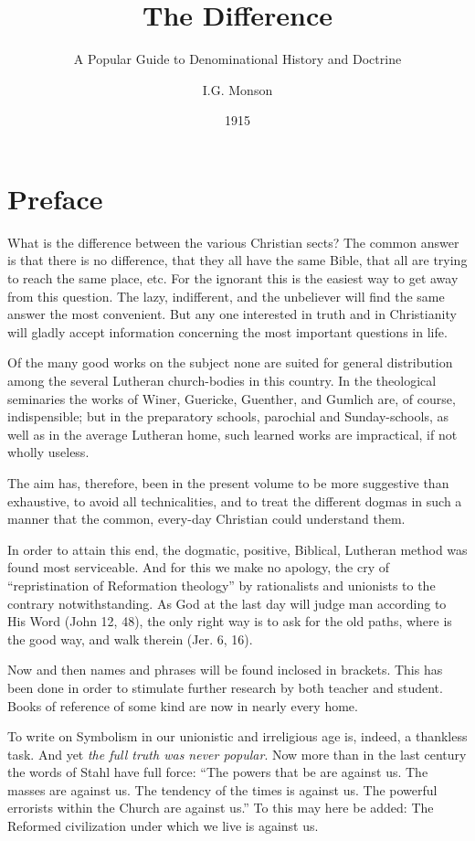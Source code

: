 \documentclass[
]{book}
\title{The Difference}
\subtitle{A Popular Guide to Denominational History and Doctrine}
\author{I.G. Monson}
\date{1915}
\begin{document}
\maketitle

{
\setcounter{tocdepth}{1}
\tableofcontents
}
\chapter*{Preface}\label{preface}

What is the difference between the various Christian sects? The common answer is that there is no difference, that they all have the same Bible, that all are trying to reach the same place, etc. For the ignorant this is the easiest way to get away from this question. The lazy, indifferent, and the unbeliever will find the same answer the most convenient. But any one interested in truth and in Christianity will gladly accept information concerning the most important questions in life.

Of the many good works on the subject none are suited for general distribution among the several Lutheran church-bodies in this country. In the theological seminaries the works of Winer, Guericke, Guenther, and Gumlich are, of course, indispensible; but in the preparatory schools, parochial and Sunday-schools, as well as in the average Lutheran home, such learned works are impractical, if not wholly useless.

The aim has, therefore, been in the present volume to be more suggestive than exhaustive, to avoid all technicalities, and to treat the different dogmas in such a manner that the common, every-day Christian could understand them.

In order to attain this end, the dogmatic, positive, Biblical, Lutheran method was found most serviceable. And for this we make no apology, the cry of ``repristination of Reformation theology'' by rationalists and unionists to the contrary notwithstanding. As God at the last day will judge man according to His Word (John 12, 48), the only right way is to ask for the old paths, where is the good way, and walk therein (Jer. 6, 16).

Now and then names and phrases will be found inclosed in brackets. This has been done in order to stimulate further research by both teacher and student. Books of reference of some kind are now in nearly every home.

To write on Symbolism in our unionistic and irreligious age is, indeed, a thankless task. And yet \emph{the full truth was never popular}. Now more than in the last century the words of Stahl have full force: ``The powers that be are against us. The masses are against us. The tendency of the times is against us. The powerful errorists within the Church are against us.'' To this may here be added: The Reformed civilization under which we live is against us.
\end{document}
